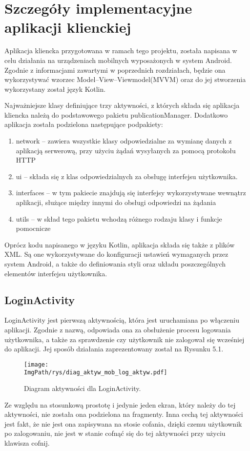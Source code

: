 \documentclass[a4paper,12pt,twoside,openany]{report}
\newcommand{\ImgPath}{.}
\begin{document}
\chapter{Szczegóły implementacyjne aplikacji klienckiej}

Aplikacja kliencka przygotowana w ramach tego projektu, została napisana w celu działania na urządzeniach mobilnych wyposażonych w system Android. Zgodnie z informacjami zawartymi w poprzednich rozdziałach, będzie ona wykorzystywać wzorzec Model--View--Viewmodel(MVVM) oraz do jej stworzenia wykorzystany został język Kotlin. 

Najważniejsze klasy definiujące trzy aktywności, z których składa się aplikacja kliencka należą do podstawowego pakietu publicationManager.
Dodatkowo aplikacja została podzielona następujące podpakiety:
\begin{enumerate}
 	\item network -- zawiera wszystkie klasy odpowiedzialne za wymianę danych z aplikacją serwerową, przy użyciu żądań wysyłanych za pomocą protokołu HTTP
 	\item ui -- składa się z klas odpowiedzialnych za obsługę interfejsu użytkownika.
 	\item interfaces -- w tym pakiecie znajdują się interfejsy wykorzystywane wewnątrz aplikacji, służące między innymi do obsługi odpowiedzi na żądania
 	\item utils -- w skład tego pakietu wchodzą różnego rodzaju klasy i funkcje pomocnicze
\end{enumerate}

Oprócz kodu napisanego w języku Kotlin, aplikacja składa się także z plików XML. Są one wykorzystywane do konfiguracji ustawień wymaganych przez system Android, a także do definiowania styli oraz układu poszczególnych elementów interfejsu użytkownika. 

\section{LoginActivity}
LoginActivity jest pierwszą aktywnością, która jest uruchamiana po włączeniu aplikacji. Zgodnie z nazwą, odpowiada ona za obsłużenie procesu logowania użytkownika, a także za sprawdzenie czy użytkownik nie zalogował się wcześniej do aplikacji. Jej sposób działania zaprezentowany został na Rysunku 5.1.
\begin{figure}[!htbp]
	\begin{center}
		\centering
		\texttt{[image: \\ImgPath/rys/diag\_aktyw\_mob\_log\_aktyw.pdf]}
	\end{center}
	\caption{Diagram aktywności dla LoginActivity.}
	\label{diagramAktywnosciLoginActivity}
\end{figure}
\pagebreak
Ze względu na stosunkową prostotę i jedynie jeden ekran, który należy do tej aktywności, nie została ona podzielona na fragmenty. Inna cechą tej aktywności jest fakt, że nie jest ona zapisywana na stosie cofania, dzięki czemu użytkownik po zalogowaniu, nie jest w stanie cofnąć się do tej aktywności przy użyciu klawisza cofnij.
\end{document}
